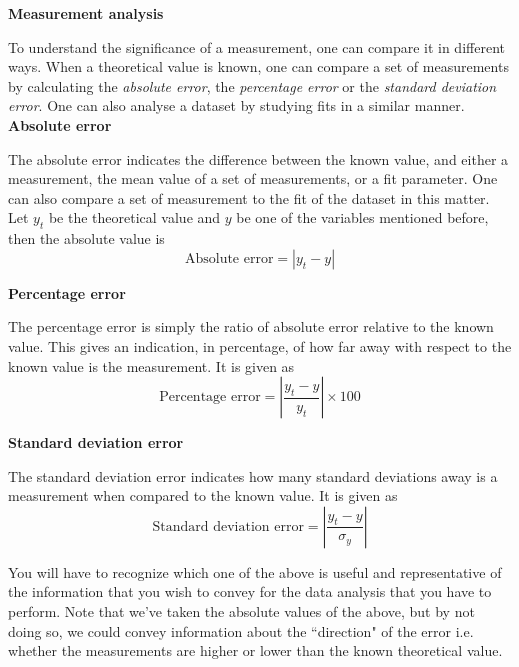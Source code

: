 \documentclass[12pt]{report}
\begin{document}
\noindent \large \textbf{Measurement analysis} \normalsize

To understand the significance of a measurement, one can compare it in different ways. When a theoretical value is known, one can compare a set of measurements by calculating the \textit{absolute error}, the \textit{percentage error} or the \textit{standard deviation error}. One can also analyse a dataset by studying fits in a similar manner. \\

\noindent \textbf{Absolute error}

The absolute error indicates the difference between the known value, and either a measurement, the mean value of a set of measurements, or a fit parameter. One can also compare a set of measurement to the fit of the dataset in this matter. Let $y_t$ be the theoretical value and $y$ be one of the variables mentioned before, then the absolute value is
\begin{equation}
\text{Absolute error} = \left\rvert y_t - y \right\rvert
\end{equation}

\noindent \textbf{Percentage error}

The percentage error is simply the ratio of absolute error relative to the known value. This gives an indication, in percentage, of how far away with respect to the known value is the measurement. It is given as
\begin{equation}
\text{Percentage error} = \left\rvert \frac{y_t - y}{y_t} \right\rvert \times 100
\end{equation}

\noindent \textbf{Standard deviation error}

The standard deviation error indicates how many standard deviations away is a measurement when compared to the known value. It is given as
\begin{equation}
\text{Standard deviation error} = \left\rvert \frac{y_t - y}{\sigma_y} \right\rvert
\end{equation}

You will have to recognize which one of the above is useful and representative of the information that you wish to convey for the data analysis that you have to perform. Note that we've taken the absolute values of the above, but by not doing so, we could convey information about the ``direction" of the error i.e. whether the measurements are higher or lower than the known theoretical value.\\
\end{document}
